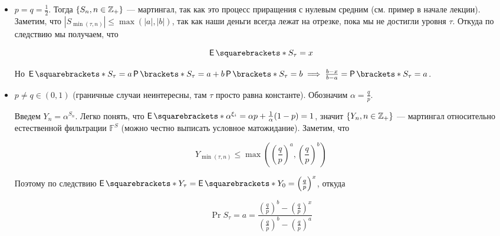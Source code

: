 \begin{itemize}
  \item $p = q = \frac12$. Тогда $\{S_n, n \in \mathbb{Z}_+\}$ --- мартингал, так как
  это процесс приращения с нулевым средним (см. пример в начале лекции).
  Заметим, что $|S_{\min(\tau, n)}| \leq \max(|a|, |b|)$, так как наши деньги
  всегда лежат на отрезке, пока мы не достигли уровня $\tau$. Откуда по следствию
  мы получаем, что

  \[
    \E{S_\tau} = x
  \]

  Но $\E{S_\tau} = a\Pr{S_\tau = a} + b\Pr{S_\tau = b} \implies \frac{b - x}{b 
  - a} = \Pr{S_\tau = a}$.

  \item $p \neq q \in (0, 1)$ (граничные случаи неинтересны, там $\tau$ просто
  равна константе). Обозначим $\alpha = \frac{q}{p}$.

  Введем $Y_n = \alpha^{S_n}$. Легко понять, что $\E{\alpha^{\xi_i}} =
  \alpha p + \frac{1}{\alpha}(1 - p) = 1$, значит $\{Y_n, n \in \mathbb{Z}_+\}$
  --- мартингал относительно естественной фильтрации $\mathbb{F}^S$ (можно честно
  выписать условное матожидание). Заметим, что

  \[
    Y_{\min(\tau, n)} \leq \max\left(\left(\frac{q}{p}\right)^a, \left(\frac{q}{p}\right)^b\right)
  \]

  Поэтому по следствию $\E{Y_{\tau}} = \E{Y_0} = \left(\frac{q}{p}\right)^x$, откуда

  \[
    \Pr{S_{\tau} = a} = \frac{\left(\frac{q}{p}\right)^b - 
    \left(\frac{q}{p}\right)^x}{\left(\frac{q}{p}\right)^b - \left(\frac{q}{p}\right)^a}
  \]
\end{itemize}
